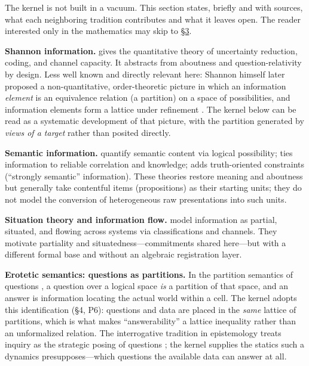 
The kernel is not built in a vacuum. This section states, briefly and with sources, what each neighboring tradition contributes and what it leaves open. The reader interested only in the mathematics may skip to \hyperlink{sec:3}{§3}.

\textbf{Shannon information.} \textcite{shannon1948,cover2006} gives the quantitative theory of uncertainty reduction, coding, and channel capacity. It abstracts from aboutness and question-relativity by design. Less well known and directly relevant here: Shannon himself later proposed a non-quantitative, order-theoretic picture in which an information \emph{element} is an equivalence relation (a partition) on a space of possibilities, and information elements form a lattice under refinement \autocite{shannon1953}. The kernel below can be read as a systematic development of that picture, with the partition generated by \emph{views of a target} rather than posited directly.

\textbf{Semantic information.} \textcite{barhillel1952} quantify semantic content via logical possibility; \autocite{dretske1981} ties information to reliable correlation and knowledge; \autocite{floridi2004} adds truth-oriented constraints (``strongly semantic'' information). These theories restore meaning and aboutness but generally take contentful items (propositions) as their starting units; they do not model the conversion of heterogeneous raw presentations into such units.

\textbf{Situation theory and information flow.} \textcite{barwise1983,barwise1997} model information as partial, situated, and flowing across systems via classifications and channels. They motivate partiality and situatedness---\hspace{0pt}commitments shared here---\hspace{0pt}but with a different formal base and without an algebraic registration layer.

\textbf{Erotetic semantics: questions as partitions.} In the partition semantics of questions \autocite{groenendijk1984,hamblin1958}, a question over a logical space \emph{is} a partition of that space, and an answer is information locating the actual world within a cell. The kernel adopts this identification (§4, P6): questions and data are placed in the \emph{same} lattice of partitions, which is what makes ``answerability'' a lattice inequality rather than an unformalized relation. The interrogative tradition in epistemology treats inquiry as the strategic posing of questions \autocite{hintikka2007,wisniewski1995}; the kernel supplies the statics such a dynamics presupposes---\hspace{0pt}which questions the available data can answer at all.

